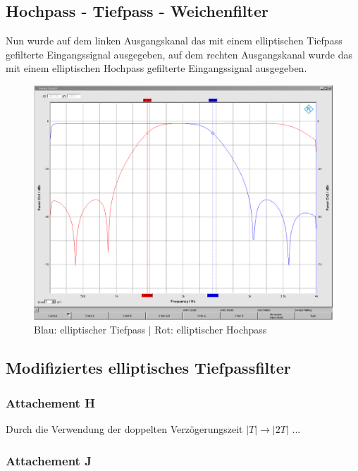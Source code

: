 \clearpage

\subsection{Hochpass - Tiefpass - Weichenfilter}
\noindent Nun wurde auf dem linken Ausgangskanal das mit einem elliptischen Tiefpass gefilterte Eingangssignal ausgegeben, auf dem rechten Ausgangskanal wurde das mit einem elliptischen Hochpass gefilterte Eingangssignal ausgegeben.

\begin{figure}[h]
	\centering
	\includegraphics[width=0.7\linewidth]{Bilder/EllipTPHP}
	\caption{Blau: elliptischer Tiefpass | Rot: elliptischer Hochpass}
	\label{fig:EllipTPHP}
\end{figure}

\clearpage

\subsection{Modifiziertes elliptisches Tiefpassfilter}
\subsubsection{Attachement H}
\noindent Durch die Verwendung der doppelten Verzögerungszeit $|T| \rightarrow |2T|$ ...

\subsubsection{Attachement J}

